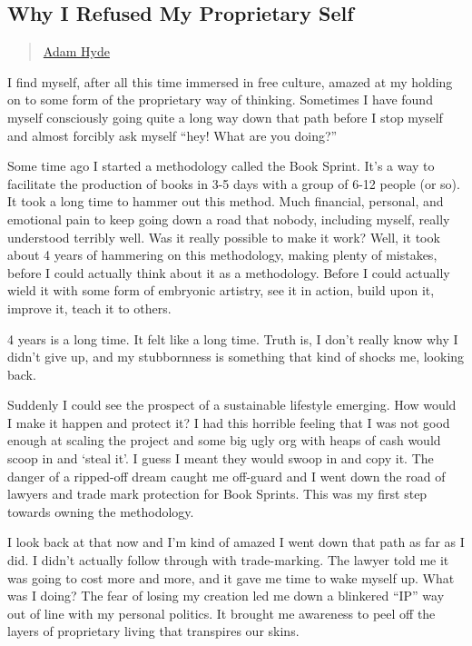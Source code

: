 \subsection{Why I Refused My Proprietary
Self}\label{why-i-refused-my-proprietary-self}

\begin{quote}
\href{../appendix/attributions.html\#adam-hyde}{Adam Hyde}
\end{quote}

I find myself, after all this time immersed in free culture, amazed at
my holding on to some form of the proprietary way of thinking. Sometimes
I have found myself consciously going quite a long way down that path
before I stop myself and almost forcibly ask myself ``hey! What are you
doing?''

Some time ago I started a methodology called the Book Sprint. It's a way
to facilitate the production of books in 3-5 days with a group of 6-12
people (or so). It took a long time to hammer out this method. Much
financial, personal, and emotional pain to keep going down a road that
nobody, including myself, really understood terribly well. Was it really
possible to make it work? Well, it took about 4 years of hammering on
this methodology, making plenty of mistakes, before I could actually
think about it as a methodology. Before I could actually wield it with
some form of embryonic artistry, see it in action, build upon it,
improve it, teach it to others.

4 years is a long time. It felt like a long time. Truth is, I don't
really know why I didn't give up, and my stubbornness is something that
kind of shocks me, looking back.

Suddenly I could see the prospect of a sustainable lifestyle emerging.
How would I make it happen and protect it? I had this horrible feeling
that I was not good enough at scaling the project and some big ugly org
with heaps of cash would scoop in and `steal it'. I guess I meant they
would swoop in and copy it. The danger of a ripped-off dream caught me
off-guard and I went down the road of lawyers and trade mark protection
for Book Sprints. This was my first step towards owning the methodology.

I look back at that now and I'm kind of amazed I went down that path as
far as I did. I didn't actually follow through with trade-marking. The
lawyer told me it was going to cost more and more, and it gave me time
to wake myself up. What was I doing? The fear of losing my creation led
me down a blinkered ``IP'' way out of line with my personal politics. It
brought me awareness to peel off the layers of proprietary living that
transpires our skins.

